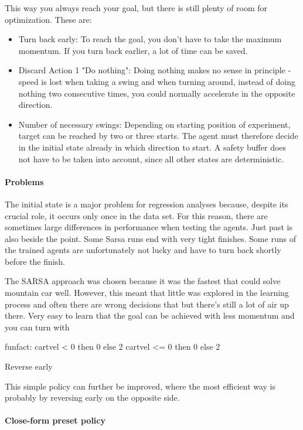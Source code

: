 This way you always reach your goal, but there is still plenty of room for optimization.
These are:
\begin{itemize}
\item Turn back early: To reach the goal, you don't have to take the maximum momentum. If you turn back earlier, a lot of time can be saved.
\item Discard Action 1 "Do nothing": Doing nothing makes no sense in principle - speed is lost when taking a swing and when turning around, instead of doing nothing two consecutive times, you could normally accelerate in the opposite direction.
\item Number of necessary swings: Depending on starting position of experiment, target can be reached by two or three starts. The agent must therefore decide in the initial state already in which direction to start. A safety buffer does not have to be taken into account, since all other states are deterministic.
\end{itemize}

\paragraph{Problems}

The initial state is a major problem for regression analyses because, despite its crucial role, it occurs only once in the data set. For this reason, there are sometimes large differences in performance when testing the agents.
Just past is also beside the point. Some Sarsa runs end with very tight finishes. Some runs of the trained agents are unfortunately not lucky and have to turn back shortly before the finish.

The SARSA approach was chosen because it was the fastest that could solve mountain car well. However, this meant that little was explored in the learning process and often there are wrong decisions that 
   but there's still a lot of air up there. Very easy to learn that the goal can be achieved with less momentum and you can turn with 

funfact:
cartvel < 0 then 0 else 2
cartvel <= 0 then 0 else 2 

Reverse early

This simple policy can further be improved, where the most efficient way is probably by reversing early on the opposite side. 

\paragraph{Close-form preset policy}

